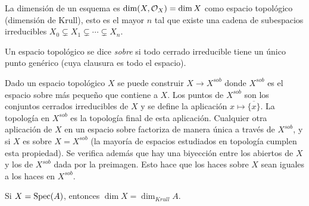 \documentclass[GA.tex]{subfiles}
\begin{document}
\begin{defi}
La dimensión de un esquema es $\dim(X,{\mathcal O}_X)=\dim X$ como espacio topológico (dimensión de Krull), esto es el mayor $n$ tal que existe una cadena de subespacios irreducibles $X_0\subsetneq X_1\subsetneq \cdots \subsetneq X_n$. 
\end{defi}

\begin{defi}
Un espacio topológico se dice \emph{sobre} si todo cerrado irreducible tiene un único punto genérico (cuya clausura es todo el espacio). 
\end{defi}
Dado un espacio topológico $X$ se puede construir $X\to X^{sob}$ donde $X^{sob}$ es el espacio sobre más pequeño que contiene a $X$. Los puntos de $X^{sob}$ son los conjuntos cerrados irreducibles de $X$ y se define la aplicación $x\mapsto \overline{\{x\}}$. La topología en $X^{sob}$ es la topología final de esta aplicación. Cualquier otra aplicación de $X$ en un espacio sobre factoriza de manera única a través de $X^{sob}$, y si $X$ es sobre $X=X^{sob}$ (la mayoría de espacios estudiados en topología cumplen esta propiedad). Se verifica además que hay una biyección entre los abiertos de $X$ y los de $X^{sob}$ dada por la preimagen. Esto hace que los haces sobre $X$ sean iguales a los haces en $X^{sob}$. 

\begin{prop}
Si $X=\operatorname{Spec}(A)$, entonces $\dim X=\dim_{Krull}A$. 
\end{prop}
\end{document}
